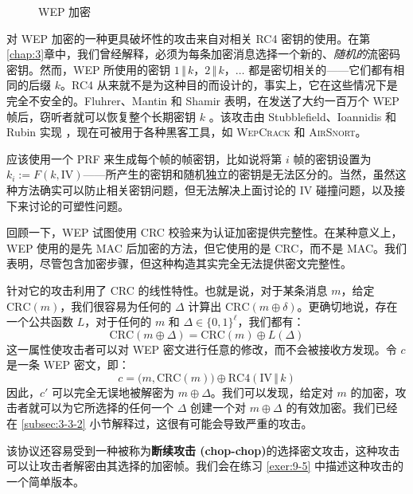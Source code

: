 \begin{figure}
  \centering
  
  \caption{WEP 加密}
  \label{fig:9-4}
\end{figure}

\begin{snote}[攻击 2：相关密钥。]
对 WEP 加密的一种更具破坏性的攻击来自对相关 RC4 密钥的使用。在第\ref{chap:3}章中，我们曾经解释，必须为每条加密消息选择一个新的、\emph{随机的}流密码密钥。然而，WEP 所使用的密钥 $1\,\Vert\,k$，$2\,\Vert\,k$，$\dots$ 都是密切相关的——它们都有相同的后缀 $k$。RC4 从来就不是为这种目的而设计的，事实上，它在这些情况下是完全不安全的。Fluhrer、Mantin 和 Shamir 表明，在发送了大约一百万个 WEP 帧后，窃听者就可以恢复整个长期密钥 $k$ \cite{fluhrer2001weaknesses}。该攻击由 Stubblefield、Ioannidis 和 Rubin 实现 \cite{stubblefield2004key}，现在可被用于各种黑客工具，如 \textsc{WepCrack} 和 \textsc{AirSnort}。

应该使用一个 PRF 来生成每个帧的帧密钥，比如说将第 $i$ 帧的密钥设置为 $k_i:=F(k,\mathrm{IV})$——所产生的密钥和随机独立的密钥是无法区分的。当然，虽然这种方法确实可以防止相关密钥问题，但无法解决上面讨论的 IV 碰撞问题，以及接下来讨论的可塑性问题。
\end{snote}

\begin{snote}[攻击 3：易被控制性。]
回顾一下，WEP 试图使用 CRC 校验来为认证加密提供完整性。在某种意义上，WEP 使用的是先 MAC 后加密的方法，但它使用的是 CRC，而不是 MAC。我们表明，尽管包含加密步骤，但这种构造其实完全无法提供密文完整性。

针对它的攻击利用了 CRC 的线性特性。也就是说，对于某条消息 $m$，给定 $\mathrm{CRC}(m)$，我们很容易为任何的 $\Delta$ 计算出 $\mathrm{CRC}(m\oplus\delta)$。更确切地说，存在一个公共函数 $L$，对于任何的 $m$ 和 $\Delta\in\{0,1\}^\ell$，我们都有：
\[
\mathrm{CRC}(m\oplus\Delta)=\mathrm{CRC}(m)\oplus L(\Delta)
\]
这一属性使攻击者可以对 WEP 密文进行任意的修改，而不会被接收方发现。令 $c$ 是一条 WEP 密文，即：
\[
c=\big(m,\mathrm{CRC}(m)\big)\oplus\mathrm{RC4}(\mathrm{IV}\,\Vert\,k)
\]
因此，$c'$ 可以完全无误地被解密为 $m\oplus\Delta$。我们可以发现，给定对 $m$ 的加密，攻击者就可以为它所选择的任何一个 $\Delta$ 创建一个对 $m\oplus\Delta$ 的有效加密。我们已经在 \ref{subsec:3-3-2} 小节解释过，这很有可能会导致严重的攻击。
\end{snote}

\begin{snote}[攻击4：选择的密码文本攻击。]
该协议还容易受到一种被称为\textbf{断续攻击 (chop-chop)}的选择密文攻击，这种攻击可以让攻击者解密由其选择的加密帧。我们会在练习 \ref{exer:9-5} 中描述这种攻击的一个简单版本。
\end{snote}

